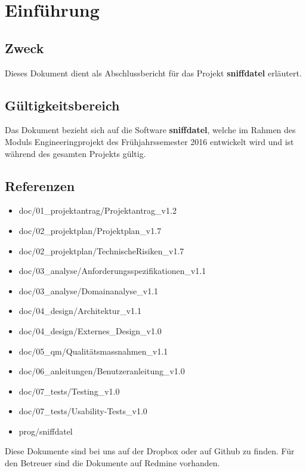 \documentclass[a4,12pt]{scrartcl}
\begin{document}
\section{Einführung}
\subsection{Zweck}
Dieses Dokument dient als Abschlussbericht für das Projekt \textbf{sniffdatel} erläutert. 
\subsection{Gültigkeitsbereich}
Das Dokument bezieht sich auf die Software \textbf{sniffdatel}, welche im Rahmen des Moduls Engineeringprojekt des Frühjahrssemester 2016 entwickelt wird und ist während des gesamten Projekts gültig. 
\subsection{Referenzen}
\begin{itemize}
\item doc/01\_projektantrag/Projektantrag\_v1.2
\item doc/02\_projektplan/Projektplan\_v1.7
\item doc/02\_projektplan/TechnischeRisiken\_v1.7
\item doc/03\_analyse/Anforderungsspezifikationen\_v1.1
\item doc/03\_analyse/Domainanalyse\_v1.1
\item doc/04\_design/Architektur\_v1.1
\item doc/04\_design/Externes\_Design\_v1.0
\item doc/05\_qm/Qualitätsmassnahmen\_v1.1
\item doc/06\_anleitungen/Benutzeranleitung\_v1.0
\item doc/07\_tests/Testing\_v1.0
\item doc/07\_tests/Usability-Tests\_v1.0
\item prog/sniffdatel
\end{itemize}
Diese Dokumente sind bei uns auf der Dropbox oder auf Github zu finden. Für den Betreuer sind die Dokumente auf Redmine vorhanden. 
\newpage
\end{document}
